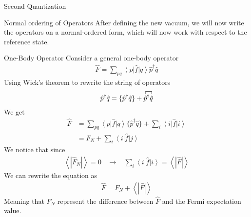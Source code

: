 \documentclass[twoside,english]{uiofysmaster}
\begin{document}
\begin{chapter}{Second Quantization}
	\begin{section}{Normal ordering of Operators}
		After defining the new vacuum, we will now write the operators on a normal-ordered form, which will now work with respect to the reference state.	
		\begin{subsection}{One-Body Operator}
			 Consider a general one-body operator
			\begin{align}
				\hat F = \sum_{pq} \left< p \right| \hat f \left| q \right> \hat p^\dagger \hat q
			\end{align}
			Using Wick's theorem to rewrite the string of operators
			\begin{align}
				\hat p^\dagger \hat q = \{\hat p^\dagger \hat q \} + \contraction{}{\hat p}{^\dagger}{\hat q}
				\hat p^\dagger \hat q
			\end{align}
			We get 	
			\begin{align}
				\hat F &= \sum_{pq} \left< p \right| \hat f \left| q \right> \{ \hat p^\dagger \hat q \} + \sum_i \left< i \right| \hat f \left| i \right>\\
					&= \hat F_N + \sum_i \left< i \right| \hat f \left| j \right>
			\end{align}
			We notice that since 
			\begin{align}
				\left< \right. | \hat F_N |\left. \right> = 0 \:\:\:\: \rightarrow \:\:\:\: \sum_i \left< i \right| \hat f \left| i \right> = \left< \right. | \hat F | \left. \right>
			\end{align}
			We can rewrite the equation as
			\begin{align}
				\hat F = F_N + \left< \right. | \hat F | \left. \right>
			\end{align}
			Meaning that $F_N$ represent the difference between $\hat F$ and the Fermi expectation value. 
		\end{subsection}
		

\end{section}
\end{chapter}
\end{document}
